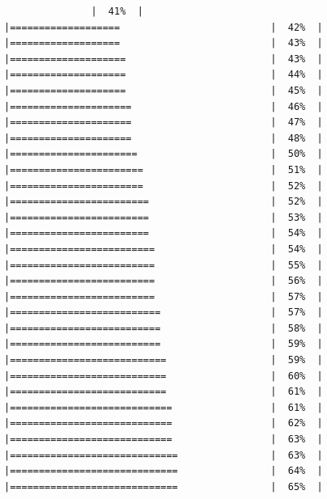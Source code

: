 \documentclass[
  krantz2]{krantz}
\begin{document}
\begin{verbatim}
               |  41%  |                                                     |===================                          |  42%  |                                                     |===================                          |  43%  |                                                     |====================                         |  43%  |                                                     |====================                         |  44%  |                                                     |====================                         |  45%  |                                                     |=====================                        |  46%  |                                                     |=====================                        |  47%  |                                                     |=====================                        |  48%  |                                                     |======================                       |  50%  |                                                     |=======================                      |  51%  |                                                     |=======================                      |  52%  |                                                     |========================                     |  52%  |                                                     |========================                     |  53%  |                                                     |========================                     |  54%  |                                                     |=========================                    |  54%  |                                                     |=========================                    |  55%  |                                                     |=========================                    |  56%  |                                                     |=========================                    |  57%  |                                                     |==========================                   |  57%  |                                                     |==========================                   |  58%  |                                                     |==========================                   |  59%  |                                                     |===========================                  |  59%  |                                                     |===========================                  |  60%  |                                                     |===========================                  |  61%  |                                                     |============================                 |  61%  |                                                     |============================                 |  62%  |                                                     |============================                 |  63%  |                                                     |=============================                |  63%  |                                                     |=============================                |  64%  |                                                     |=============================                |  65%  |                                                     
\end{verbatim}
\end{document}
